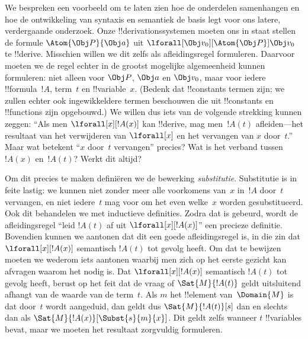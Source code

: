 \documentclass[../../../include/open-logic-section]{subfiles}
\begin{document}


We bespreken een voorbeeld om te laten zien hoe de onderdelen
samenhangen en hoe de ontwikkeling van syntaxis en semantiek de basis
legt voor ons latere, verdergaande onderzoek. Onze
!!{derivation}ssystemen moeten ons in staat stellen de formule
$\Atom{\Obj P}{\Obj a}$ uit $\lforall[\Obj
v_0][\Atom{\Obj P}]{\Obj v_0}$ te !!{derive}. Misschien willen we dit zelfs als
afleidingsregel formuleren. Daarvoor moeten we de regel echter in de
grootst mogelijke algemeenheid kunnen formuleren: niet alleen voor
$\Obj P$, $\Obj a$ en $\Obj v_0$, maar voor iedere !!{formula}~$!A$,
term~$t$ en !!{variable}~$x$. (Bedenk dat !!{constant}s termen zijn;
we zullen echter ook ingewikkeldere termen beschouwen die uit
!!{constant}s en !!{function}s zijn opgebouwd.) We willen dus iets van
de volgende strekking kunnen zeggen: ``Als men
$\lforall[x][!A(x)]$ kan !!{derive}, mag men~$!A(t)$ afleiden---het
resultaat van het verwijderen van $\lforall[x]$ en het vervangen van
$x$ door~$t$.'' Maar wat betekent ``$x$ door~$t$ vervangen'' precies?
Wat is het verband tussen $!A(x)$ en~$!A(t)$? Werkt dit altijd?

Om dit precies te maken definiëren we de bewerking
\emph{substitutie}. Substitutie is in feite lastig: we kunnen niet
zonder meer alle voorkomens van~$x$ in~$!A$ door~$t$ vervangen, en niet
iedere~$t$ mag voor om het even welke~$x$ worden gesubstitueerd. Ook dit
behandelen we met inductieve definities. Zodra dat is gebeurd, wordt de
afleidingsregel ``leid $!A(t)$ af uit $\lforall[x][!A(x)]$'' een
precieze definitie. Bovendien kunnen we aantonen dat dit een goede
afleidingsregel is, in die zin dat $\lforall[x][!A(x)]$ semantisch
$!A(t)$ tot gevolg heeft. Om dat te bewijzen moeten we wederom iets
aantonen waarbij men zich op het eerste gezicht kan afvragen waarom het
nodig is. Dat $\lforall[x][!A(x)]$ semantisch $!A(t)$ tot gevolg heeft,
berust op het feit dat de vraag of $\Sat{M}{!A(t)}$ geldt uitsluitend
afhangt van de waarde van de term~$t$. Als $m$ het !!{element}
van~$\Domain{M}$ is dat door~$t$ wordt aangeduid, dan geldt dus
$\Sat{M}{!A(t)}[s]$ dan en slechts dan als
$\Sat{M}{!A(x)}[\Subst{s}{m}{x}]$. Dit geldt zelfs wanneer $t$
!!{variable}s bevat, maar we moeten het resultaat zorgvuldig
formuleren.
\end{document}
